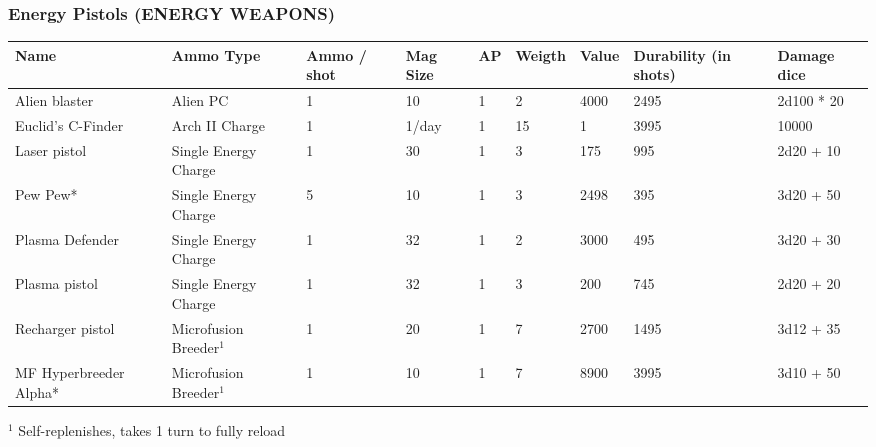 
\subsubsection{Energy Pistols (ENERGY WEAPONS)}
\begin{longtable}{|p{3.2cm}|p{2.4cm}|p{1.3cm}|p{.9cm}|p{0.6cm}|p{1.3cm}|p{1cm}|p{2cm}|p{3.2cm}|}
\hline
\bfseries Name & \bfseries Ammo Type & \bfseries Ammo / shot & \bfseries Mag Size & \bfseries AP & \bfseries Weigth & \bfseries Value & \bfseries Durability (in shots) & \bfseries Damage dice \\
\hline
\endhead
Alien blaster & Alien PC & 1 & 10 & 1 & 2 & 4000 & 2495 & 2d100 * 20 \\
Euclid's C-Finder & Arch II Charge & 1 & 1/day & 1 & 15 & 1 & 3995 & 10000 \\
Laser pistol & Single Energy Charge & 1 & 30 & 1 & 3 & 175 & 995 & 2d20 + 10 \\
Pew Pew* & Single Energy Charge & 5 & 10 & 1 & 3 & 2498 & 395 & 3d20 + 50 \\
Plasma Defender & Single Energy Charge & 1 & 32 & 1 & 2 & 3000 & 495 & 3d20 + 30 \\
Plasma pistol & Single Energy Charge & 1 & 32 & 1 & 3 & 200 & 745 & 2d20 + 20 \\
Recharger pistol & Microfusion Breeder$^1$ & 1 & 20 & 1 & 7 & 2700 & 1495 & 3d12 + 35 \\
MF Hyperbreeder Alpha* & Microfusion Breeder$^1$ & 1 & 10 & 1 & 7 & 8900 & 3995 & 3d10 + 50 \\
\hline
\end{longtable}
$^1$  Self-replenishes, takes 1 turn to fully reload